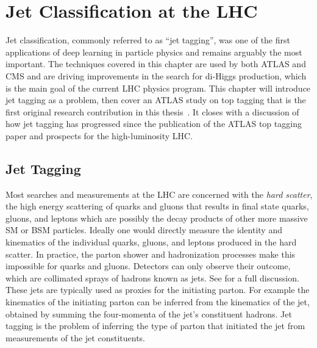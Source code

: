 
\chapter{Jet Classification at the LHC}
\label{ch:tagging}

Jet classification, commonly referred to as ``jet tagging'', was one of the first applications of deep learning in particle physics and remains arguably the most important.
The techniques covered in this chapter are used by both ATLAS and CMS and are driving improvements in the search for di-Higgs production, which is the main goal of the current LHC physics program.
This chapter will introduce jet tagging as a problem, then cover an ATLAS study on top tagging that is the first original research contribution in this thesis~\cite{ATLAS:2024rua}.
It closes with a discussion of how jet tagging has progressed since the publication of the ATLAS top tagging paper and prospects for the high-luminosity LHC.

\section{Jet Tagging}
\label{sec:tagging-intro}

Most searches and measurements at the LHC are concerned with the \textit{hard scatter}, the high energy scattering of quarks and gluons that results in final state quarks, gluons, and leptons which are possibly the decay products of other more massive SM or BSM particles.
Ideally one would directly measure the identity and kinematics of the individual quarks, gluons, and leptons produced in the hard scatter.
In practice, the parton shower and hadronization processes make this impossible for quarks and gluons.
Detectors can only observe their outcome, which are collimated sprays of hadrons known as jets.
See  for a full discussion.
These jets are typically used as proxies for the initiating parton.
For example the kinematics of the initiating parton can be inferred from the kinematics of the jet, obtained by summing the four-momenta of the jet's constituent hadrons.
Jet tagging is the problem of inferring the type of parton that initiated the jet from measurements of the jet constituents.

